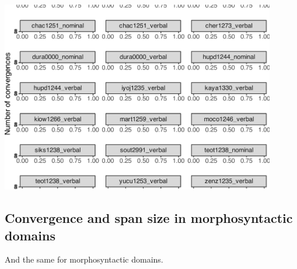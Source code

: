 \documentclass[
]{article}
\begin{document}
\begin{center}\includegraphics[width=0.9\textwidth,height=\textheight]{02_analyses_chapter17_files/figure-latex/conv phon plot-1} \end{center}

\subsection{Convergence and span size in morphosyntactic
domains}\label{convergence-and-span-size-in-morphosyntactic-domains}

And the same for morphosyntactic domains.
\end{document}
